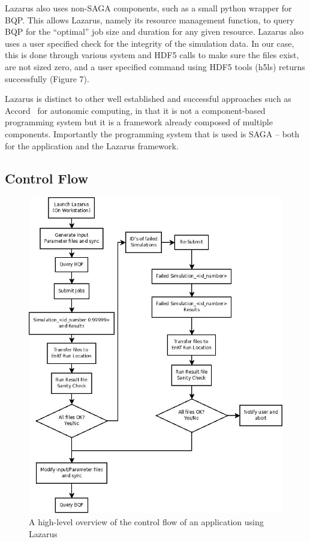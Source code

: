 \documentclass{sig-alternate}
\newcommand{\up}{\vspace*{-0.3em}}
\begin{document}
Lazarus also uses non-SAGA components, such as a small python wrapper
for BQP. This allows Lazarus, namely its resource management function,
to query BQP for the ``optimal'' job size and duration for any given
resource. Lazarus also uses a user specified check for the integrity
of the simulation data. In our case, this is done through various
system and HDF5 calls to make sure the files exist, are not sized
zero, and a user specified command using HDF5 tools (h5ls) returns
successfully (Figure 7).

Lazarus is distinct to other well established and successful approaches such as Accord~\cite{accord} for autonomic computing, in that it is not a component-based programming system but it is a framework already composed of multiple components. Importantly the programming system that is used is SAGA -- both for the application and the Lazarus framework.

\subsection{Control Flow}

\begin{figure}
\begin{center}
\includegraphics[scale=0.35]{./figures/Diagram1.jpeg}
\end{center}
\up\up\up\up\up\up
\caption{A high-level overview of the control flow of an application using Lazarus}
\up\up\up \up\up\up \up
\label{fig:controlflow}
\end{figure}
\end{document}
